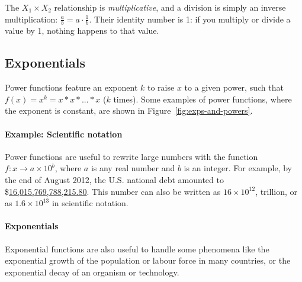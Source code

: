   The $X_1 \times X_2$ relationship is \emph{multiplicative}, and a division is simply an inverse multiplication: $\frac{a}{b} = a \cdot \frac{1}{b}$. Their identity number is 1: if you multiply or divide a value by 1, nothing happens to that value.%


%
%
\subsection{Exponentials}

Power functions feature an exponent $k$ to raise $x$ to a given power, such that $f(x) = x^k = x*x*...*x$ ($k$ times). Some examples of power functions, where the exponent is constant, are shown in Figure~\ref{fig:exps-and-powers}.%

%
\paragraph{Example: Scientific notation}%
%
Power functions are useful to rewrite large numbers with the function $f: x \to a \times 10^b$, where $a$ is any real number and $b$ is an integer. For example, by the end of August 2012, the U.S. national debt amounted to \$\href{http://www.treasurydirect.gov/NP/BPDLogin?application=np}{16,015,769,788,215.80}. This number can also be written as $16 \times 10^{12}$,  trillion, or as \ensuremath{1.6\times 10^{13}} in scientific notation.

%
\paragraph{Exponentials}

Exponential functions are also useful to handle some phenomena like the exponential growth of the population or labour force in many countries, or the exponential decay of an organism or technology.

